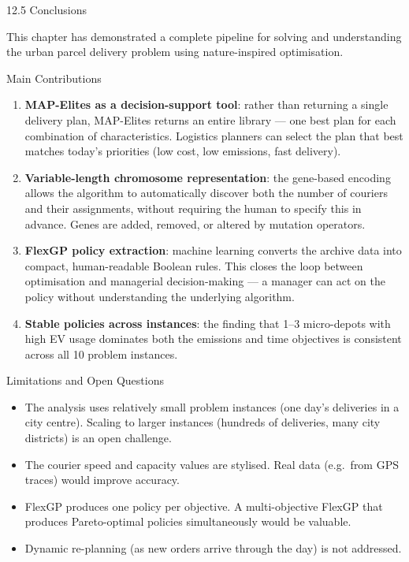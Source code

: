 \documentclass[aspectratio=169,10pt]{beamer}
\begin{document}
\begin{frame}[allowframebreaks]{12.5 Conclusions}

This chapter has demonstrated a complete pipeline for
solving and understanding the urban parcel delivery problem
using nature-inspired optimisation.

\medskip

\begin{block}{Main Contributions}
  \begin{enumerate}
    \item \textbf{MAP-Elites as a decision-support tool}:
          rather than returning a single delivery plan,
          MAP-Elites returns an entire library --- one best plan
          for each combination of characteristics.
          Logistics planners can select the plan that best matches
          today's priorities (low cost, low emissions, fast delivery).

    \item \textbf{Variable-length chromosome representation}:
          the gene-based encoding allows the algorithm to automatically
          discover both the number of couriers and their assignments,
          without requiring the human to specify this in advance.
          Genes are added, removed, or altered by mutation operators.

    \item \textbf{FlexGP policy extraction}:
          machine learning converts the archive data into
          compact, human-readable Boolean rules.
          This closes the loop between optimisation and managerial
          decision-making --- a manager can act on the policy
          without understanding the underlying algorithm.

    \item \textbf{Stable policies across instances}:
          the finding that 1--3 micro-depots with high EV usage
          dominates both the emissions and time objectives is
          consistent across all 10 problem instances.
  \end{enumerate}
\end{block}

\medskip

\begin{block}{Limitations and Open Questions}
  \begin{itemize}
    \item The analysis uses relatively small problem instances
          (one day's deliveries in a city centre).
          Scaling to larger instances (hundreds of deliveries,
          many city districts) is an open challenge.
    \item The courier speed and capacity values are stylised.
          Real data (e.g.\ from GPS traces) would improve accuracy.
    \item FlexGP produces one policy per objective.
          A multi-objective FlexGP that produces Pareto-optimal
          policies simultaneously would be valuable.
    \item Dynamic re-planning (as new orders arrive through the day)
          is not addressed.
  \end{itemize}
\end{block}


\end{frame}
\end{document}

